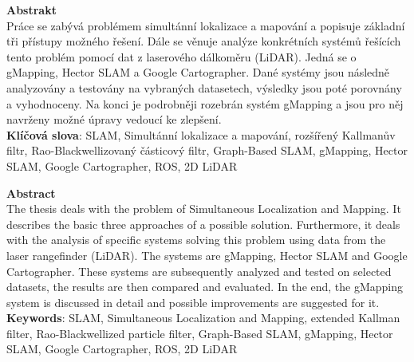 \documentclass[12pt]{report}
\begin{document}
\newpage

\noindent\textbf{\Large{Abstrakt}}\\

\noindent Práce se zabývá problémem simultánní lokalizace a mapování a popisuje základní tři přístupy možného řešení. Dále se věnuje analýze konkrétních systémů řešících tento problém pomocí dat z laserového dálkoměru (LiDAR). Jedná se o gMapping, Hector SLAM a Google Cartographer. Dané systémy jsou následně analyzovány a testovány na vybraných datasetech, výsledky jsou poté porovnány a vyhodnoceny. Na konci je podrobněji rozebrán systém gMapping a jsou pro něj navrženy možné úpravy vedoucí ke zlepšení.\\

\noindent\textbf{Klíčová slova}: SLAM, Simultánní lokalizace a mapování, rozšířený Kallmanův filtr, Rao-Blackwellizovaný částicový filtr, Graph-Based SLAM, gMapping, Hector SLAM, Google Cartographer, ROS, 2D LiDAR\\
\newline\newline\newline


\noindent\textbf{\Large{Abstract}}\\

\noindent The thesis deals with the problem of Simultaneous Localization and Mapping. It describes the basic three approaches of a possible solution. Furthermore, it deals with the analysis of specific systems solving this problem using data from the laser rangefinder (LiDAR). The systems are gMapping, Hector SLAM and Google Cartographer. These systems are subsequently analyzed and tested on selected datasets, the results are then compared and evaluated. In the end, the gMapping system is discussed in detail and possible improvements are suggested for it.\\

\noindent\textbf{Keywords}: SLAM, Simultaneous Localization and Mapping, extended Kallman filter, Rao-Blackwellized particle filter, Graph-Based SLAM, gMapping, Hector SLAM, Google Cartographer, ROS, 2D LiDAR

\newpage	
	
\tableofcontents
\newpage
\end{document}
